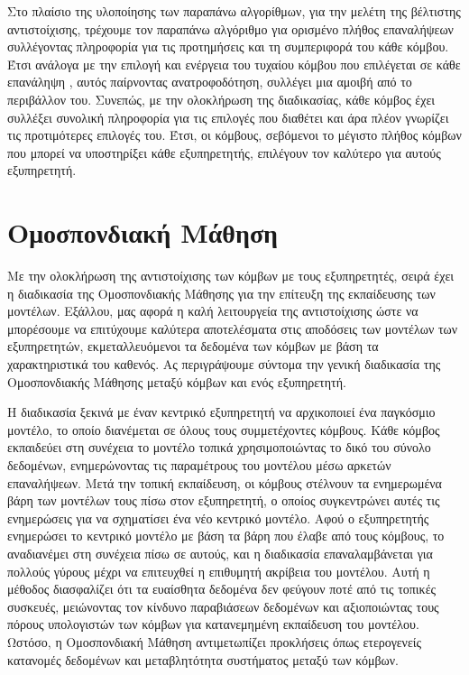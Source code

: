 Στο πλαίσιο της υλοποίησης των παραπάνω αλγορίθμων, για την μελέτη της βέλτιστης αντιστοίχισης, τρέχουμε τον παραπάνω αλγόριθμο για ορισμένο πλήθος επαναλήψεων συλλέγοντας πληροφορία για τις προτημήσεις και τη συμπεριφορά του κάθε κόμβου. Έτσι ανάλογα με την επιλογή και ενέργεια του τυχαίου κόμβου που επιλέγεται σε κάθε επανάληψη , αυτός παίρνοντας ανατροφοδότηση, συλλέγει μια αμοιβή από το περιβάλλον του. Συνεπώς, με την ολοκλήρωση της διαδικασίας, κάθε κόμβος έχει συλλέξει συνολική πληροφορία για τις επιλογές που διαθέτει και άρα πλέον γνωρίζει τις προτιμότερες επιλογές του. Έτσι, οι κόμβους, σεβόμενοι το μέγιστο πλήθος κόμβων που μπορεί να υποστηρίξει κάθε εξυπηρετητής, επιλέγουν τον καλύτερο για αυτούς εξυπηρετητή.

\section{Ομοσπονδιακή Μάθηση}

Με την ολοκλήρωση της αντιστοίχισης των κόμβων με τους εξυπηρετητές, σειρά έχει η διαδικασία της Ομοσπονδιακής Μάθησης για την επίτευξη της εκπαίδευσης των μοντέλων. Εξάλλου, μας αφορά η καλή λειτουργεία της αντιστοίχισης ώστε να μπορέσουμε να επιτύχουμε καλύτερα αποτελέσματα στις αποδόσεις των μοντέλων των εξυπηρετητών, εκμεταλλευόμενοι τα δεδομένα των κόμβων με βάση τα χαρακτηριστικά του καθενός. Ας περιγράψουμε σύντομα την γενική διαδικασία της Ομοσπονδιακής Μάθησης μεταξύ κόμβων και ενός εξυπηρετητή. 

Η διαδικασία ξεκινά με έναν κεντρικό εξυπηρετητή να αρχικοποιεί ένα παγκόσμιο μοντέλο, το οποίο διανέμεται σε όλους τους συμμετέχοντες κόμβους. Κάθε κόμβος εκπαιδεύει στη συνέχεια το μοντέλο τοπικά χρησιμοποιώντας το δικό του σύνολο δεδομένων, ενημερώνοντας τις παραμέτρους του μοντέλου μέσω αρκετών επαναλήψεων. Μετά την τοπική εκπαίδευση, οι κόμβους στέλνουν τα ενημερωμένα βάρη των μοντέλων τους πίσω στον εξυπηρετητή, ο οποίος συγκεντρώνει αυτές τις ενημερώσεις για να σχηματίσει ένα νέο κεντρικό μοντέλο. Αφού ο εξυπηρετητής ενημερώσει το κεντρικό μοντέλο με βάση τα βάρη που έλαβε από τους κόμβους, το αναδιανέμει στη συνέχεια πίσω σε αυτούς, και η διαδικασία επαναλαμβάνεται για πολλούς γύρους μέχρι να επιτευχθεί η επιθυμητή ακρίβεια του μοντέλου. Αυτή η μέθοδος διασφαλίζει ότι τα ευαίσθητα δεδομένα δεν φεύγουν ποτέ από τις τοπικές συσκευές, μειώνοντας τον κίνδυνο παραβιάσεων δεδομένων και αξιοποιώντας τους πόρους υπολογιστών των κόμβων για κατανεμημένη εκπαίδευση του μοντέλου. Ωστόσο, η Ομοσπονδιακή Μάθηση αντιμετωπίζει προκλήσεις όπως ετερογενείς κατανομές δεδομένων και μεταβλητότητα συστήματος μεταξύ των κόμβων.


